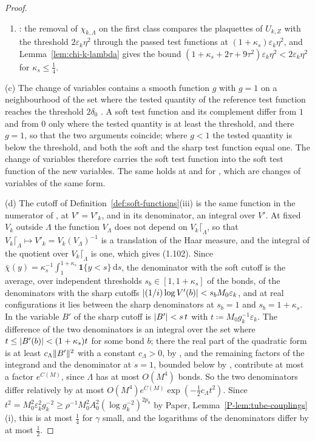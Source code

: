 \documentclass[11pt]{preprint}
\newcommand{\dd}{\mathrm{d}}
\DeclarePairedDelimiter{\abs}{\lvert}{\rvert}
\DeclarePairedDelimiter{\norm}{\lVert}{\rVert}
\numberwithin{equation}{section}
\theoremstyle{definition}
\theoremstyle{remark}
\theoremstyle{plain}
\begin{document}
\begin{proof}
\begin{enumerate}[label=(\roman*)]
\item \cite[p.~378, l.~10]{BalabanLFR2}: the removal of $\chi_{k,\Lambda}$ on the first class compares the plaquettes of $U_{k,Z}$ with the threshold $2\varepsilon_k\eta^2$ through the passed test functions at $(1 + \kappa_s)\varepsilon_k\eta^2$, and Lemma~\ref{lem:chi-k-lambda} gives the bound $(1 + \kappa_s + 2\tau + 9\tau^2)\varepsilon_k\eta^2 < 2\varepsilon_k\eta^2$ for $\kappa_s \leq \frac14$.
\end{enumerate}

(c) The change of variables \cite[(1.22), p.~251]{BalabanCRE} contains a smooth function $g$ with $g = 1$ on a neighbourhood of the set where the tested quantity of the reference test function reaches the threshold $2\delta_0$ \cite[p.~252]{BalabanCRE}. A soft test function and its complement differ from $1$ and from $0$ only where the tested quantity is at least the threshold, and there $g = 1$, so that the two arguments coincide; where $g < 1$ the tested quantity is below the threshold, and both the soft and the sharp test function equal one. The change of variables therefore carries the soft test function into the soft test function of the new variables. The same holds at \cite[p.~269]{BalabanCRE} and for \cite[(1.59), p.~188]{BalabanLFR1}, which are changes of variables of the same form.

(d) The cutoff of Definition~\ref{def:soft-functions}(iii) is the same function in the numerator of \cite[(1.100)]{BalabanLFR1}, at $V' = V'_k$, and in its denominator, an integral over $V'$. At fixed $V_k$ outside $\Lambda$ the function $V_\Lambda$ does not depend on $V_k\lceil_\Lambda$, so that $V_k\lceil_\Lambda \mapsto V'_k = V_k(V_\Lambda)^{-1}$ is a translation of the Haar measure, and the integral of the quotient over $V_k\lceil_\Lambda$ is one, which gives (1.102). Since $\bar\chi(y) = \kappa_s^{-1}\int_1^{1+\kappa_s}\mathbf 1\{y < s\}\,\dd s$, the denominator with the soft cutoff is the average, over independent thresholds $s_b \in [1, 1 + \kappa_s]$ of the bonds, of the denominators with the sharp cutoffs $\abs{(1/i)\log V'(b)} < s_bM_0\varepsilon_k$, and at real configurations it lies between the sharp denominators at $s_b = 1$ and $s_b = 1 + \kappa_s$. In the variable $B'$ of \cite[(1.1), (1.2), pp.~356--357]{BalabanLFR2} the sharp cutoff is $\abs{B'} < s\,t$ with $t \coloneqq M_0g_k^{-1}\varepsilon_k$. The difference of the two denominators is an integral over the set where $t \leq \abs{B'(b)} < (1 + \kappa_s)t$ for some bond $b$; there the real part of the quadratic form is at least $c_\Lambda\norm{B'}^2$ with a constant $c_\Lambda > 0$, by \cite[(1.7)--(1.9), p.~358]{BalabanLFR2}, and the remaining factors of the integrand and the denominator at $s = 1$, bounded below by \cite[(1.10), (1.11), p.~358]{BalabanLFR2}, contribute at most a factor $e^{C(M)}$, since $\Lambda$ has at most $O(M^4)$ bonds. So the two denominators differ relatively by at most $O(M^4)e^{C(M)}\exp(-\frac12c_\Lambda t^2)$. Since $t^2 = M_0^2\varepsilon_k^2g_k^{-2} \geq \rho^{-1}M_0^2A_0^2(\log g_k^{-2})^{2p_0}$ by Paper, Lemma~\ref{P-lem:tube-couplings}(i), this is at most $\frac14$ for $\gamma$ small, and the logarithms of the denominators differ by at most $\frac12$.


\end{proof}
\end{document}
